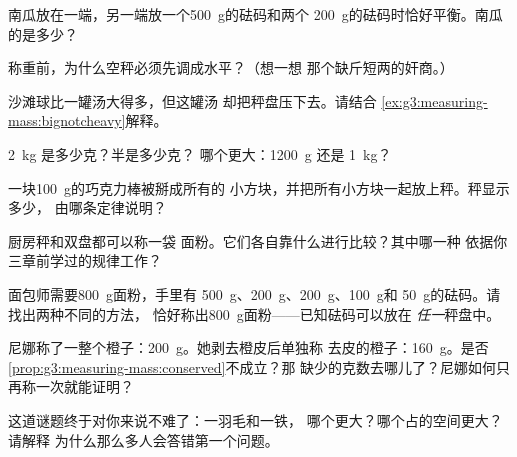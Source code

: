 \begin{exercise}[$\star$]\label{exo:g3:measuring-mass:3}
南瓜放在一端，另一端放一个\qty{500}{g}的砝码和两个
\qty{200}{g}的砝码时恰好平衡。南瓜的是多少？
\end{exercise}

\begin{exercise}[$\star$]\label{exo:g3:measuring-mass:4}
称重前，为什么空秤必须先调成水平？（想一想
那个缺斤短两的奸商。）
\end{exercise}

\begin{exercise}[$\star$]\label{exo:g3:measuring-mass:5}
沙滩球比一罐汤大得多，但这罐汤
却把秤盘压下去。请结合
\cref{ex:g3:measuring-mass:bignotcheavy}解释。
\end{exercise}

\begin{exercise}[$\star$]\label{exo:g3:measuring-mass:6}
\qty{2}{kg} 是多少克？半是多少克？
哪个更大：\qty{1200}{g} 还是 \qty{1}{kg}？
\end{exercise}

\begin{exercise}[$\star$]\label{exo:g3:measuring-mass:7}
一块\qty{100}{g}的巧克力棒被掰成所有的
小方块，并把所有小方块一起放上秤。秤显示多少，
由哪条定律说明？
\end{exercise}

\begin{exercise}[$\star$]\label{exo:g3:measuring-mass:8}
厨房秤和双盘都可以称一袋
面粉。它们各自靠什么进行比较？其中哪一种
依据你三章前学过的规律工作？
\end{exercise}

\begin{exercise}[$\star$]\label{exo:g3:measuring-mass:9}
面包师需要\qty{800}{g}面粉，手里有
\qty{500}{g}、\qty{200}{g}、\qty{200}{g}、\qty{100}{g}和
\qty{50}{g}的砝码。请找出两种不同的方法，
恰好称出\qty{800}{g}面粉——已知砝码可以放在
\emph{任一}秤盘中。
\end{exercise}

\begin{exercise}[$\star\star$]\label{exo:g3:measuring-mass:10}
尼娜称了一整个橙子：\qty{200}{g}。她剥去橙皮后单独称
去皮的橙子：\qty{160}{g}。是否
\cref{prop:g3:measuring-mass:conserved}不成立？那
缺少的克数去哪儿了？尼娜如何只再称一次就能证明？
\end{exercise}

\begin{exercise}[$\star\star$]\label{exo:g3:measuring-mass:11}
这道谜题终于对你来说不难了：一羽毛和一铁，
哪个更大？哪个占的空间更大？请解释
为什么那么多人会答错第一个问题。
\end{exercise}
